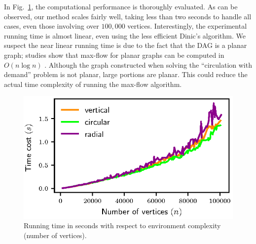 In Fig.~\ref{fig:simulations_runtime}, the computational performance is thoroughly 
evaluated. As can be observed, our method scales fairly well, taking less than two seconds
to handle all cases, even those involving over $100,000$ vertices. 
%
Interestingly, the experimental running time is almost linear, even using the less efficient Dinic's algorithm. 
%
We suspect the near linear running time is due to the fact that the DAG is 
a planar graph; studies show that max-flow for planar graphs can be computed 
in $O(n\log n)$ \cite{borradaile2009n}. 
%
Although the graph constructed when solving the ``circulation with demand'' problem is not planar, large portions are planar. 
This could reduce the actual time complexity of running the max-flow algorithm.

\begin{figure}[h]
\vspace{2mm}
    \centering
    \includegraphics[width=0.9\linewidth]{chapters/sc/fig/runtime.eps}
    \caption{Running time in seconds with respect to environment complexity (number of vertices). }
    \label{fig:simulations_runtime}
\end{figure}

